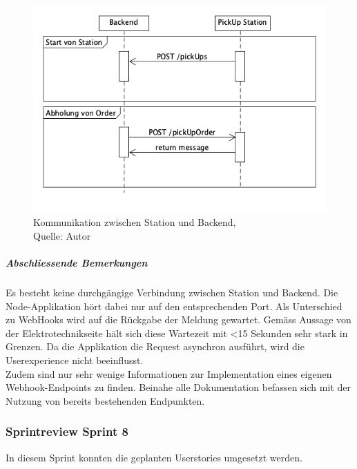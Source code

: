 \begin{figure}[H]
	\centering
	\includegraphics[scale=0.5]{images/backendStationCom.PNG}
	\caption[Kommunikation zwischen Station und Backend]{Kommunikation zwischen Station und Backend,\\ Quelle: Autor}
	\label{img: stationBackendCom}
\end{figure} 


\subparagraph{Abschliessende Bemerkungen}
Es besteht keine durchgängige Verbindung zwischen Station und Backend. Die Node-Applikation hört dabei nur auf den entsprechenden Port. 
Als Unterschied zu WebHooks wird auf die Rückgabe der Meldung gewartet. Gemäss Aussage von der Elektrotechnikseite hält sich diese Wartezeit mit <15 Sekunden sehr stark in Grenzen. Da die Applikation die Request asynchron ausführt, wird die Userexperience nicht beeinflusst.\\
Zudem sind nur sehr wenige Informationen zur Implementation eines eigenen Webhook-Endpoints zu finden. Beinahe alle Dokumentation befassen sich mit der Nutzung von bereits bestehenden Endpunkten. 

\subsubsection{Sprintreview Sprint 8}
In diesem Sprint konnten die geplanten Userstories umgesetzt werden. 

